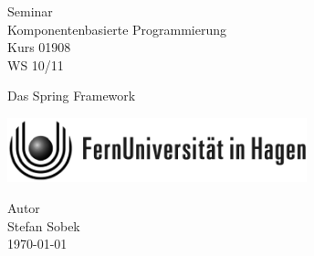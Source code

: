 

\begin{titlepage}
\vspace{4em}
\center
 \Huge{\textsf{Seminar\\ Komponentenbasierte Programmierung}}\\
 \vspace{1em}
\Large{\textsf{Kurs 01908}}\\
\vspace{2em}
\Large{\textsf{WS 10/11}}\\
\vspace{2em}

\Huge{\textsf{Das Spring Framework}}\\
\vspace{2em}

\begin{center}
	\includegraphics[width=0.65\textwidth]{images/feulogo}
\end{center}

\vspace{3em}

\Large{
\textsf{
Autor\\
Stefan Sobek\\
\vspace{2em}
\today
}
}
\end{titlepage}
